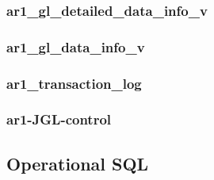 \documentclass[12pt,twoside]{article}
\begin{document}
\subsubsection{ar1\_gl\_detailed\_data\_info\_v}
\label{sec-11-8-1}
\subsubsection{ar1\_gl\_data\_info\_v}
\label{sec-11-8-2}
\subsubsection{ar1\_transaction\_log}
\label{sec-11-8-3}
\subsubsection{ar1-JGL-control}
\label{sec-11-8-4}
\subsection{Operational SQL}
\label{sec-11-9}
\end{document}
